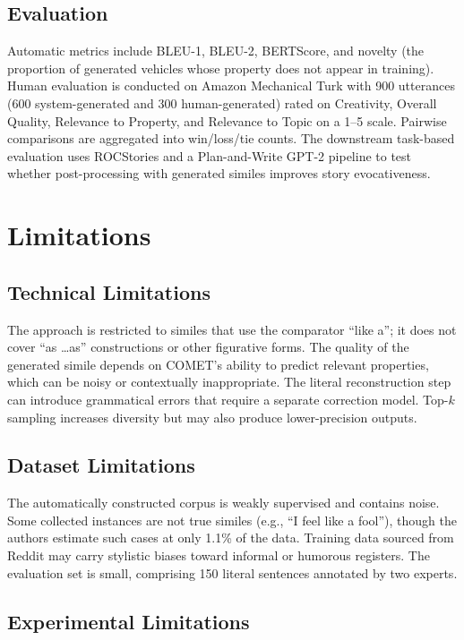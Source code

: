 \documentclass[12pt]{article}
\begin{document}
\subsection{Evaluation}

Automatic metrics include BLEU-1, BLEU-2, BERTScore, and novelty (the proportion of generated vehicles whose property does not appear in training). Human evaluation is conducted on Amazon Mechanical Turk with 900 utterances (600 system-generated and 300 human-generated) rated on Creativity, Overall Quality, Relevance to Property, and Relevance to Topic on a 1--5 scale. Pairwise comparisons are aggregated into win/loss/tie counts. The downstream task-based evaluation uses ROCStories and a Plan-and-Write GPT-2 pipeline to test whether post-processing with generated similes improves story evocativeness.

\section{Limitations}

\subsection{Technical Limitations}

The approach is restricted to similes that use the comparator ``like a''; it does not cover ``as \ldots as'' constructions or other figurative forms. The quality of the generated simile depends on COMET's ability to predict relevant properties, which can be noisy or contextually inappropriate. The literal reconstruction step can introduce grammatical errors that require a separate correction model. Top-$k$ sampling increases diversity but may also produce lower-precision outputs.

\subsection{Dataset Limitations}

The automatically constructed corpus is weakly supervised and contains noise. Some collected instances are not true similes (e.g., ``I feel like a fool''), though the authors estimate such cases at only 1.1\% of the data. Training data sourced from Reddit may carry stylistic biases toward informal or humorous registers. The evaluation set is small, comprising 150 literal sentences annotated by two experts.

\subsection{Experimental Limitations}
\end{document}
